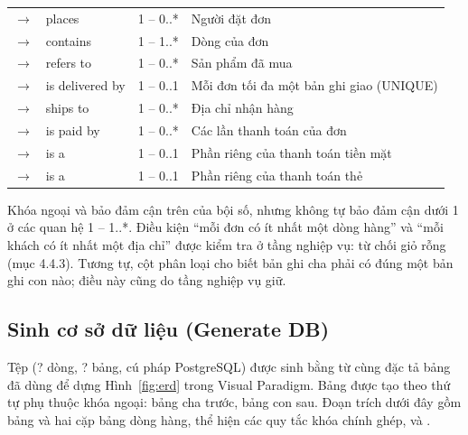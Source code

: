 \documentclass[12pt,a4paper]{article}
\providecommand{\sqlTableCount}{?}
\providecommand{\sqlLineCount}{?}
\begin{document}
\begin{longtable}{@{}P{4.9cm}P{2.4cm}P{1.6cm}P{6.6cm}@{}}
\small{} $\to$  & \small places & \small 1 -- 0..* & \small Người đặt đơn\\
\small{} $\to$  & \small contains & \small 1 -- 1..* & \small Dòng của đơn\\
\small{} $\to$  & \small refers to & \small 1 -- 0..* & \small Sản phẩm đã mua\\
\small{} $\to$  & \small is delivered by & \small 1 -- 0..1 & \small Mỗi đơn tối đa một bản ghi giao (UNIQUE)\\
\small{} $\to$  & \small ships to & \small 1 -- 0..* & \small Địa chỉ nhận hàng\\
\small{} $\to$  & \small is paid by & \small 1 -- 0..* & \small Các lần thanh toán của đơn\\
\small{} $\to$  & \small is a & \small 1 -- 0..1 & \small Phần riêng của thanh toán tiền mặt\\
\small{} $\to$  & \small is a & \small 1 -- 0..1 & \small Phần riêng của thanh toán thẻ\\
\bottomrule
\end{longtable}

Khóa ngoại và  bảo đảm cận trên của bội số, nhưng không tự bảo đảm cận dưới 1 ở các quan
hệ 1 -- 1..*. Điều kiện ``mỗi đơn có ít nhất một dòng hàng'' và ``mỗi khách có ít nhất một địa chỉ'' được
kiểm tra ở tầng nghiệp vụ:  từ chối giỏ rỗng (mục 4.4.3). Tương tự, cột
phân loại cho biết bản ghi cha phải có đúng một bản ghi con nào; điều này cũng do tầng nghiệp vụ giữ.

\subsection{Sinh cơ sở dữ liệu (Generate DB)}

Tệp  (\sqlLineCount{} dòng, \sqlTableCount{} bảng, cú pháp PostgreSQL) được
sinh bằng  từ cùng đặc tả bảng đã dùng để dựng Hình~\ref{fig:erd} trong Visual Paradigm. Bảng
được tạo theo thứ tự phụ thuộc khóa ngoại: bảng cha trước, bảng con sau. Đoạn trích dưới đây gồm bảng
 và hai cặp bảng dòng hàng, thể hiện các quy tắc khóa chính ghép,  và
.
\end{document}
